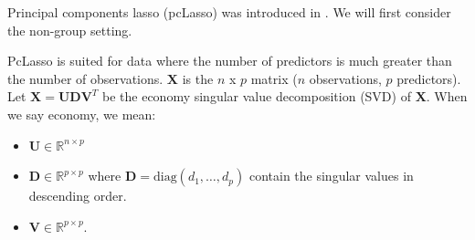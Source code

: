 \documentclass[10pt]{article}
\begin{document}
Principal components lasso (pcLasso) was introduced in \cite{2018arXiv181004651T}. We will first consider the non-group setting. 

PcLasso is suited for data where the number of predictors is much greater than the number of observations. $\mathbf{X}$ is the $n$ x $p$ matrix ($n$ observations, $p$ predictors). Let $\mathbf{X} = \mathbf{U} \mathbf{D} \mathbf{V}^T$ be the economy singular value decomposition (SVD) of $\mathbf{X}$. When we say economy, we mean:
\begin{itemize}
    \item $\mathbf{U} \in \mathbb{R}^{n \times p}$
    \item $\mathbf{D} \in \mathbb{R}^{p \times p}$ where $\mathbf{D} = \mathrm{diag}(d_1, \ldots, d_p)$ contain the singular values in descending order. 
    \item $\mathbf{V} \in \mathbb{R}^{p \times p}$.
\end{itemize}
   
\end{document}
